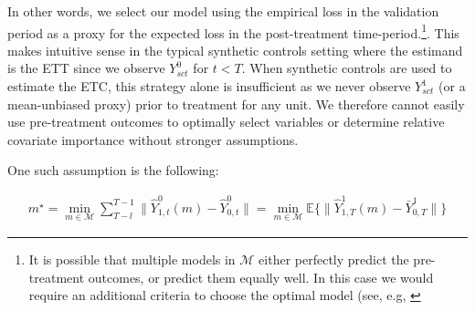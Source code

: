 In other words, we select our model using the empirical loss in the validation period as a proxy for the expected loss in the post-treatment time-period.\footnote{It is possible that multiple models in $\mathcal{M}$ either perfectly predict the pre-treatment outcomes, or predict them equally well. In this case we would require an additional criteria to choose the optimal model (see, e.g, \cite{becker2017cross}}. This makes intuitive sense in the typical synthetic controls setting where the estimand is the ETT since we observe $Y^0_{sct}$ for $t < T$. When synthetic controls are used to estimate the ETC, this strategy alone is insufficient as we never observe $Y^1_{sct}$ (or a mean-unbiased proxy) prior to treatment for any unit. We therefore cannot easily use pre-treatment outcomes to optimally select variables or determine relative covariate importance without stronger assumptions.

One such assumption is the following:

\begin{align*}\label{assumption:second}
m^\star = \min_{m \in \mathcal{M}}\sum_{T - l}^{T-1}\|\hat{Y}^0_{1, t}(m) - \hat{Y}^0_{0, t}\| = \min_{m \in \mathcal{M}}\mathbb{E}\{\|\hat{Y}^1_{1, T}(m) - \bar{Y}^1_{0, T}\|\}
\end{align*}

